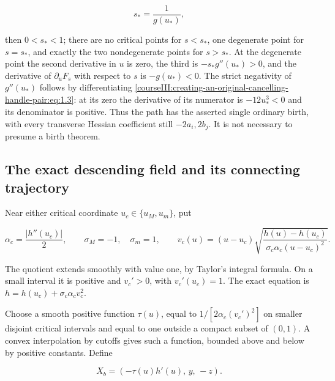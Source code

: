 \begin{equation}
s_*=\frac1{g(u_*)},
 \label{courseIII:creating-an-original-cancelling-handle-pair:eq:3.8}
\end{equation}

then \(0<s_*<1\); there are no critical points for \(s<s_*\), one degenerate point for \(s=s_*\), and exactly the two nondegenerate points for \(s>s_*\). At the degenerate point the second derivative in \(u\) is zero, the third is \(-s_*g''(u_*)>0\), and the derivative of \(\partial_uF_s\) with respect to \(s\) is \(-g(u_*)<0\). The strict negativity of \(g''(u_*)\) follows by differentiating \eqref{courseIII:creating-an-original-cancelling-handle-pair:eq:1.3}: at its zero the derivative of its numerator is \(-12u_*^3<0\) and its denominator is positive. Thus the path has the asserted single ordinary birth, with every transverse Hessian coefficient still \(-2a_i,2b_j\). It is not necessary to presume a birth theorem.

\subsection{The exact descending field and its connecting trajectory}
\label{courseIII:creating-an-original-cancelling-handle-pair:pair-connecting-trajectory}

\label{courseIII:creating-an-original-cancelling-handle-pair:section-4}\label{courseIII:pair-creation:4}

Near either critical coordinate \(u_c\in\{u_M,u_m\}\), put

\begin{equation}
\alpha_c=\frac{|h''(u_c)|}{2},\qquad
 \sigma_M=-1,\quad\sigma_m=1,\qquad
 v_c(u)=(u-u_c)
 \sqrt{\frac{h(u)-h(u_c)}{\sigma_c\alpha_c(u-u_c)^2}}.
 \label{courseIII:creating-an-original-cancelling-handle-pair:eq:4.1}
\end{equation}

The quotient extends smoothly with value one, by Taylor's integral formula. On a small interval it is positive and \(v_c'>0\), with \(v_c'(u_c)=1\). The exact equation is \(h=h(u_c)+\sigma_c\alpha_c v_c^2\).

Choose a smooth positive function \(\tau(u)\), equal to \(1/[2\alpha_c(v_c')^2]\) on smaller disjoint critical intervals and equal to one outside a compact subset of \((0,1)\). A convex interpolation by cutoffs gives such a function, bounded above and below by positive constants. Define

\begin{equation}
X_b=(-\tau(u)h'(u),\,y,\,-z).
 \label{courseIII:creating-an-original-cancelling-handle-pair:eq:4.2}
\end{equation}

